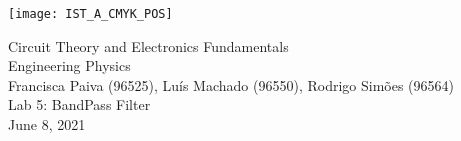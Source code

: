 
\thispagestyle {empty}

\texttt{[image: IST\_A\_CMYK\_POS]}

\begin{center}
%
\vspace{1.0cm}

\vspace{1cm}
{\FontLb Circuit Theory and Electronics Fundamentals} \\ %
\vspace{1cm}
{\FontSn Engineering Physics} \\ %
{\small Francisca Paiva (96525), Luís Machado (96550), Rodrigo Simões (96564)} \\
\vspace{1cm}
{\FontSn Lab 5: BandPass Filter} \\
\vspace{1cm}
{\FontSn June 8, 2021} \\ %
%
\end{center}
